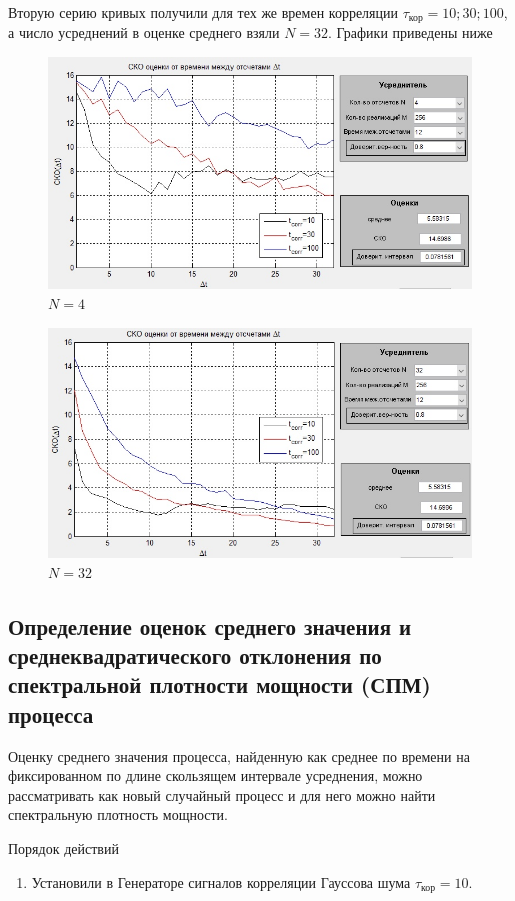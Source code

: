Вторую серию кривых получили для тех же времен корреляции $\tau_\text{кор}= 10; 30; 100$, а число усреднений в оценке среднего взяли $N = 32$.
Графики приведены ниже
\begin{figure}[H]
	\centering
	\includegraphics[width=\linewidth]{tasks/task4/realize1}
	\caption*{$N = 4$}
\end{figure}

\begin{figure}[H]
	\centering
	\includegraphics[width=\linewidth]{tasks/task4/realize2}
	\caption*{$N = 32$}
\end{figure}
\subsection[Задание 5]{Определение оценок среднего значения и среднеквадратического отклонения по спектральной плотности мощности (СПМ) процесса}
Оценку среднего значения процесса, найденную как среднее по времени на фиксированном по длине скользящем интервале усреднения, можно рассматривать как новый случайный процесс и для него можно найти спектральную плотность мощности.

Порядок действий
\begin{enumerate}
	\item Установили в Генераторе сигналов корреляции Гауссова шума $\tau_\text{кор}=10$.
\end{enumerate}
